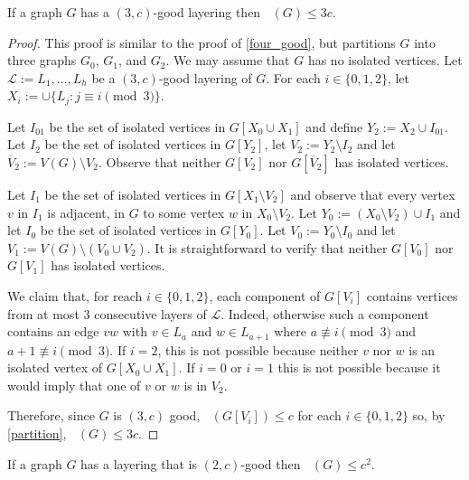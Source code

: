 \documentclass{patmorin}
\DeclareMathOperator{\odd}{\chi_o}
\begin{document}
\begin{lem}\label{three_good}
  If a graph $G$ has a $(3,c)$-good layering then $\odd(G)\le 3c$.
\end{lem}

\begin{proof}
  This proof is similar to the proof of \cref{four_good}, but partitions $G$ into three graphs $G_0$, $G_1$, and $G_2$.  We may assume that $G$ has no isolated vertices. Let $\mathcal{L}:=L_1,\ldots,L_h$ be a $(3,c)$-good layering of $G$. For each $i\in\{0,1,2\}$, let $X_i:=\cup\{L_j:j\equiv i\pmod 3\}$.

  Let $I_{01}$ be the set of isolated vertices in $G[X_0\cup X_1]$ and define $Y_2:=X_2\cup I_{01}$.  Let $I_2$ be the set of isolated vertices in $G[Y_2]$, let $V_2:=Y_2\setminus I_2$ and let $\overline{V}_2:=V(G)\setminus V_2$.  Observe that neither $G[V_2]$ nor $G[\overline{V}_2]$ has isolated vertices.

  Let $I_1$ be the set of isolated vertices in $G[X_1\setminus V_2]$ and observe that every vertex $v$ in $I_1$ is adjacent, in $G$ to some vertex $w$ in $X_0\setminus V_2$.  Let $Y_0:=(X_0\setminus V_2)\cup I_1$ and let $I_0$ be the set of isolated vertices in $G[Y_0]$.  Let $V_0:=Y_0\setminus I_0$ and let $V_1:=V(G)\setminus(V_0\cup V_2)$.  It is straightforward to verify that neither $G[V_0]$ nor $G[V_1]$ has isolated vertices.

  We claim that, for reach $i\in\{0,1,2\}$, each component of $G[V_i]$ contains vertices from at most $3$ consecutive layers of $\mathcal{L}$.  Indeed, otherwise such a component contains an edge $vw$ with $v\in L_a$ and $w\in L_{a+1}$ where $a\not\equiv i\pmod 3$ and $a+1\not\equiv i\pmod 3$.  If $i=2$, this is not possible because neither $v$ nor $w$ is an isolated vertex of $G[X_0\cup X_1]$.  If $i=0$ or $i = 1$ this is not possible because it would imply that one of $v$ or $w$ is in $V_2$.

  Therefore, since $G$ is $(3,c)$ good, $\odd(G[V_i])\le c$ for each $i\in\{0,1,2\}$ so, by \cref{partition}, $\odd(G)\le 3c$.
\end{proof}

\begin{lem}
  If a graph $G$ has a layering that is $(2,c)$-good then $\odd(G)\le c^2$.
\end{lem}
\end{document}
